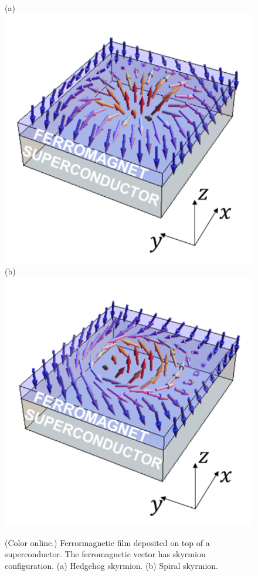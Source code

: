 \documentclass[twocolumn,showpacs,floatfix,nofootinbib,longbibliography]{revtex4-1}
\begin{document}
\begin{figure} \centering
(a) \includegraphics[width=0.4\linewidth]{SkyrmA}  
(b) \includegraphics[width=0.4\linewidth]{SkyrmB} 
\caption{(Color online.) Ferrormagnetic film deposited on top of a superconductor. The ferromagnetic vector has skyrmion configuration. (a) Hedgehog skyrmion.  (b) Spiral skyrmion. } \label{fig:skyrmion}
\end{figure}
\end{document}
